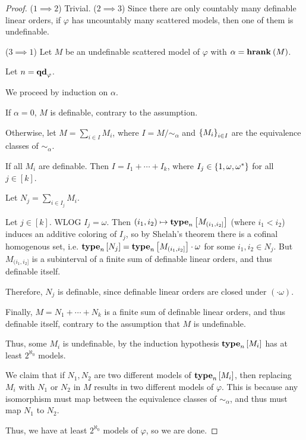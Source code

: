 \begin{proof}
    ($1 \implies 2$) Trivial.
    ($2 \implies 3$) Since there are only countably many
    definable linear orders,
    if $\varphi$ has uncountably many scattered models,
    then one of them is undefinable.

    ($3 \implies 1$)
    Let $M$ be an undefinable scattered model of $\varphi$
    with $\alpha = \mathbf{hrank}_{} \left( {M} \right)$.

    Let $n = \mathbf{qd}_{\varphi}$.

    We proceed by induction on $\alpha$.

    If $\alpha = 0$, $M$ is definable, contrary to the assumption.

    Otherwise, let $M = \sum_{i \in I} M_i$,
    where $I = M / \sim_{\alpha}$ and $\left\{ {M_i} \right\}_{i \in I}$
    are the equivalence classes of $\sim_{\alpha}$.

    If all $M_i$ are definable. Then $I = I_1 + \cdots + I_k$,
    where $I_j \in \left\{ {1, \omega, \omega^\ast} \right\}$ for all $j \in [k]$.

    Let $N_j = \sum_{i \in I_j} M_i$.

    Let $j \in [k]$. WLOG $I_j = \omega$.
    Then $(i_1, i_2) \mapsto \mathbf{type}_{n} \left[ {M_{(i_1, i_2]}} \right]$ (where $i_1 < i_2$)
    induces an additive coloring of $I_j$, so by Shelah's theorem
    there is a cofinal homogenous set,
    i.e. $\mathbf{type}_{n} \left[ {N_j} \right] = \mathbf{type}_{n} \left[ {M_{(i_1, i_2]}} \right] \cdot \omega$ for some
    $i_1, i_2 \in N_j$. But $M_{(i_1, i_2]}$ is a subinterval
    of a finite sum of definable linear orders,
    and thus definable itself.

    Therefore, $N_j$ is definable, since
    definable linear orders are closed under $(\cdot \omega)$.

    Finally, $M = N_1 + \cdots + N_k$ is a finite sum of definable linear orders,
    and thus definable itself, contrary to the assumption that $M$ is undefinable.

    Thus, some $M_i$ is undefinable, by the induction
    hypothesis $\mathbf{type}_{n} \left[ {M_i} \right]$ has at least
    $2^{\aleph_0}$ models.

    We claim that if $N_1, N_2$ are two different models of $\mathbf{type}_{n} \left[ {M_i} \right]$,
    then replacing $M_i$ with $N_1$ or $N_2$ in $M$
    results in two different models of $\varphi$.
    This is because any isomorphism must map
    between the equivalence classes of $\sim_{\alpha}$,
    and thus must map $N_1$ to $N_2$.

    Thus, we have at least $2^{\aleph_0}$ models of $\varphi$,
    so we are done.
\end{proof}

